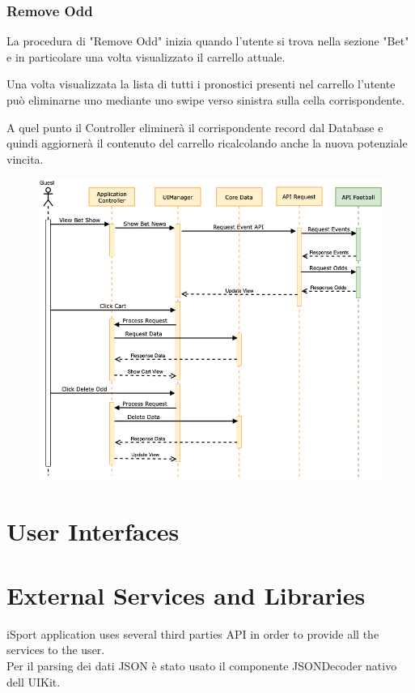 \documentclass[numbers=noenddot, 12pt, a4paper, oneside]{scrbook}
\begin{document}
\subsection*{Remove Odd}
La procedura di "Remove Odd" inizia quando l'utente si trova nella sezione "Bet" e in particolare una volta visualizzato il carrello attuale.

Una volta visualizzata la lista di tutti i pronostici presenti nel carrello l'utente può eliminarne uno mediante uno swipe verso sinistra sulla cella corrispondente.

A quel punto il Controller eliminerà il corrispondente record dal Database e quindi aggiornerà il contenuto del carrello ricalcolando anche la nuova potenziale vincita.
\begin{figure}[H]
	\centering
	\includegraphics[width=1\textwidth]{images/Sequence/SequenceRemoveOdd}
\end{figure}




\chapter{User Interfaces}
\chapter{External Services and Libraries}
iSport application uses several third parties API in order to provide all the services to the user.\\
Per il parsing dei dati JSON è stato usato il componente JSONDecoder nativo dell UIKit.
\end{document}
